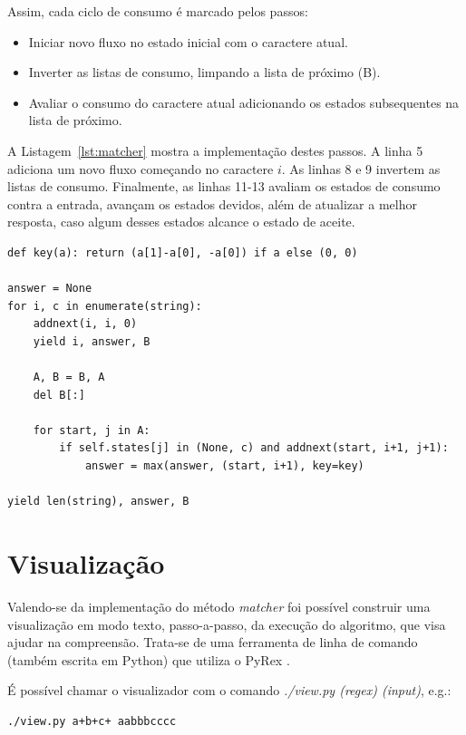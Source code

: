 \documentclass[a4paper,12pt,oneside,onecolumn]{uerj}
\begin{document}
Assim, cada ciclo de consumo é marcado pelos passos:

\begin{itemize}
    \item Iniciar novo fluxo no estado inicial com o caractere atual.
    \item Inverter as listas de consumo, limpando a lista de próximo (B).
    \item Avaliar o consumo do caractere atual adicionando os estados subsequentes na lista de próximo.
\end{itemize}

A Listagem~\ref{lst:matcher} mostra a implementação destes passos. A linha 5 adiciona um novo fluxo começando no caractere $i$. As linhas 8 e 9 invertem as listas de consumo. Finalmente, as linhas 11-13 avaliam os estados de consumo contra a entrada, avançam os estados devidos, além de atualizar a melhor resposta, caso algum desses estados alcance o estado de aceite.

\vspace{0.5cm}
\begin{lstlisting}[caption={Implementação do método \emph{matcher}},label=lst:matcher]
def key(a): return (a[1]-a[0], -a[0]) if a else (0, 0)

answer = None
for i, c in enumerate(string):
    addnext(i, i, 0)
    yield i, answer, B
    
    A, B = B, A
    del B[:]

    for start, j in A:
        if self.states[j] in (None, c) and addnext(start, i+1, j+1):
            answer = max(answer, (start, i+1), key=key)
    
yield len(string), answer, B
\end{lstlisting}

\section{Visualização}

Valendo-se da implementação do método \emph{matcher} foi possível construir uma visualização em modo texto, passo-a-passo, da execução do algoritmo, que visa ajudar na compreensão. Trata-se de uma ferramenta de linha de comando (também escrita em Python) que utiliza o PyRex .

É possível chamar o visualizador com o comando \emph{./view.py (regex) (input)}, e.g.:

\begin{verbatim}
./view.py a+b+c+ aabbbcccc
\end{verbatim}
\end{document}
